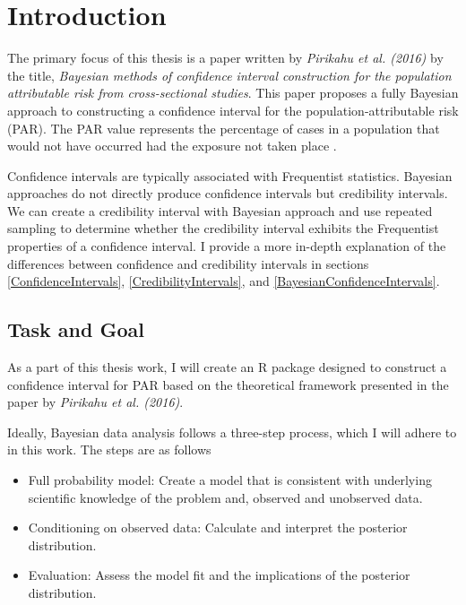 \chapter{Introduction} \label{sec:Intro}

The primary focus of this thesis is a paper written by \textit{Pirikahu et al. (2016)} by the title, \textit{Bayesian methods of confidence interval construction for the population attributable risk from cross-sectional studies}. This paper proposes a fully Bayesian approach to constructing a confidence interval for the population-attributable risk (PAR). The PAR value represents the percentage of cases in a population that would not have occurred had the exposure not taken place \cite{Pirikahu2016BayesianMO}.

Confidence intervals are typically associated with Frequentist statistics. Bayesian approaches do not directly produce confidence intervals but credibility intervals. We can create a credibility interval with Bayesian approach and use repeated sampling to determine whether the credibility interval exhibits the Frequentist properties of a confidence interval. I provide a more in-depth explanation of the differences between confidence and credibility intervals in sections \ref{ConfidenceIntervals}, \ref{CredibilityIntervals}, and \ref{BayesianConfidenceIntervals}.

\section{Task and Goal} \label{sec:Task}

As a part of this thesis work, I will create an R package designed to construct a confidence interval for PAR based on the theoretical framework presented in the paper by \textit{Pirikahu et al. (2016)}. 

Ideally, Bayesian data analysis follows a three-step process, which I will adhere to in this work. The steps are as follows

\begin{itemize}
    \item Full probability model: Create a model that is consistent with underlying scientific knowledge of the problem and, observed and unobserved data. 
    \item Conditioning on observed data: Calculate and interpret the posterior distribution.
    \item Evaluation: Assess the model fit and the implications of the posterior distribution.
\end{itemize} \cite{Gel2014BayesianDA}

